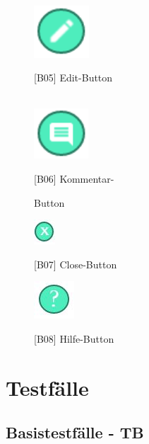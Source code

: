 \documentclass[a4paper]{scrreprt}
\begin{document}
\begin{figure}[h!]
\begin{minipage}[t]{0.45\linewidth}
    			\label{fig:figure1}
    			\end{minipage}
    			\hspace{0.5cm}
    			\begin{minipage}[t]{0.45\linewidth}
    			\flushright
    			\centering
    			\vspace{9mm}
    			\hfill \\
    			\includegraphics[width=0.05\textheight]{edit_button.PNG}
    			\caption{{[}B05{]} Edit-Button}
    			\label{fig:figure1}
    			\hfill \\
    			\includegraphics[width=0.05\textheight]{comment_button.PNG}
    			\caption{{[}B06{]} Kommentar-} {Button}
    			\label{fig:figure1}
			
			\includegraphics[width=0.04\textheight]{closebutton.JPG}
    			\caption{{[}B07{]} Close-Button}
    			\label{fig:figure1}
    			\includegraphics[width=0.05\textheight]{hilfebutton.JPG}
    			\caption{{[}B08{]} Hilfe-Button}
    			\label{fig:figure1}
    			\end{minipage}
    		\end{figure}
    
    	\clearpage

    \chapter{Testfälle}
    
    	\section{Basistestfälle - TB}    
    	
\end{document}
